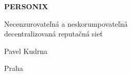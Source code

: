 \thispagestyle{empty}
\begin{center}
  {\sffamily\bfseries\fontsize{34}{40}\selectfont PERSONIX\par}
  \vspace{2.2em}
  {\rmfamily\large Necenzurovateľná a neskorumpovateľná\\[0.25em]
   decentralizovaná reputačná sieť\par}
\end{center}
\begin{center}
  {\rmfamily\Large Pavel Kudrna\par}
  \vspace{0.45em}
  {\rmfamily\small Praha\quad\textbullet{}\par}
\end{center}
\clearpage
